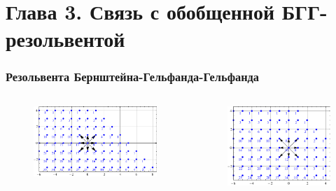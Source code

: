 \documentclass[pdftex]{beamer}
\theoremstyle{definition} \newtheorem{Def}{Определение}
\begin{document}
\section{Глава 3. Связь с обобщенной БГГ-резольвентой}
\begin{frame}
  \frametitle{Резольвента Бернштейна-Гельфанда-Гельфанда}
  \vspace*{-0.5cm}
  \begin{columns}
    \begin{figure}[b]
      \centering
      \includegraphics[width=60mm]{figures/B2-Verma}      
    \end{figure}

     \begin{figure}[b]
       \centering
      \vspace*{-0.2cm}
      \includegraphics[width=50mm]{figures/B2-parabolic-verma}

    \end{figure}


\end{columns}
\end{frame}
\end{document}
